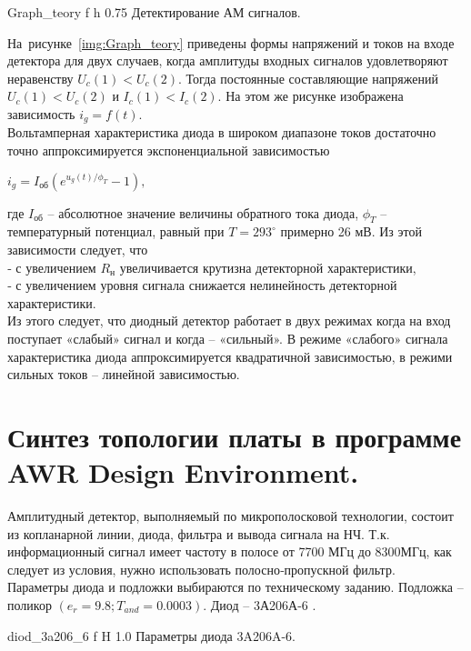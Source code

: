 \documentclass{bmstu}
\begin{document}
		{Graph_teory}
		{f} %
		{h} %
		{0.75\textwidth} %
		{Детектирование АМ сигналов.} %
	
\indent	На~рисунке~\ref{img:Graph_teory} приведены 
	формы
	напряжений и токов на входе детектора для двух случаев, когда амплитуды входных
	сигналов удовлетворяют неравенству $U_c(1) < U_c(2)$. Тогда постоянные 
	составляющие напряжений $U_c(1) < U_c(2)$ и $I_c(1) < I_c(2)$. На этом же 
	рисунке изображена зависимость $i_g = f(t)$. \\
\indent	Вольтамперная характеристика диода в широком диапазоне токов достаточно 
	точно аппроксимируется экспоненциальной зависимостью
	\begin{center}
		$i_g = I_\text{об} (e^{u_g(t)/\phi_T} - 1),$
	\end{center}

\indent где $I_\text{об}$ – абсолютное значение величины обратного тока диода,
	$\phi_T$ – температурный потенциал, равный при $T = 293^{\circ}$ примерно 26
	мВ. Из этой зависимости следует, что \\
\indent	‐ с увеличением $R_\text{н}$ увеличивается крутизна детекторной
	характеристики, \\
\indent	‐ с увеличением уровня сигнала снижается нелинейность детекторной 
	характеристики. \\
\indent	Из этого следует, что диодный детектор работает в двух режимах когда на вход
	поступает «слабый» сигнал и когда – «сильный». В режиме «слабого» сигнала
	характеристика диода аппроксимируется квадратичной зависимостью, в режими 
	сильных токов – линейной зависимостью.
	
	
	\chapter{Синтез топологии платы в программе AWR Design Environment.}
	
	Амплитудный детектор, выполняемый по микрополосковой технологии, состоит из 
	копланарной линии, диода, фильтра и вывода сигнала на НЧ. Т.к. информационный 
	сигнал имеет частоту в полосе от 7700 МГц до 8300МГц, как следует из условия, 
	нужно использовать полосно‐пропускной фильтр. \\
\indent	Параметры диода и подложки выбираются по техническому заданию. Подложка – 
	поликор $(e_r = 9.8; T_{and} = 0.0003)$. Диод – 3А206А-6 \cite{8}.
	
	{diod_3a206_6}
	{f} %
	{H} %
	{1.0\textwidth} %
	{Параметры диода 3A206A-6.} %
	
\end{document}
